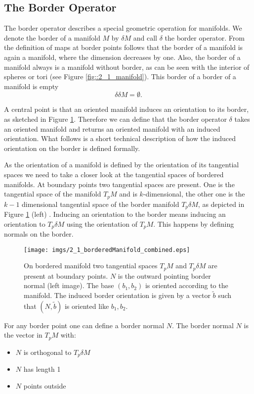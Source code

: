 \subsection{The Border Operator}
The border operator describes a special geometric operation for manifolds. 
We denote the border of a manifold $M$ by $\delta M$ and call $\delta$ the border operator. From the definition of maps at border points follows that the border of a manifold is again a manifold, where the dimension decreases by one. Also, the border of a manifold always is a manifold without border, as can be seen with the interior of spheres or tori (see Figure \ref{fig::2_1_manifold}). This border of a border of a manifold is empty
\[\delta\delta M = \emptyset.\]

A central point  is that an oriented manifold induces an orientation to its border, as sketched in Figure \ref{fig::2_1_borderManifold}. Therefore we can define that the border operator $\delta$ takes an oriented manifold and returns an oriented manifold with an induced orientation.  What follows is a short technical description of how the induced orientation on the border is defined formally. 

 As the orientation of a manifold is defined by the orientation of its tangential spaces we need to take a closer look at the tangential spaces of bordered manifolds.
At boundary points two tangential spaces are present. One is the tangential space of the manifold $T_pM$ and is $k$-dimensional, the other one is the $k-1$ dimensional tangential space of the border manifold $T_p \delta M$, as depicted in Figure \ref{fig::2_1_borderManifold} (left) . Inducing an orientation to the border means inducing an orientation to $T_p\delta M$ using the orientation of $T_p M$. This happens by defining normals on the border.

\begin{figure}
\begin{center}
\texttt{[image: imgs/2\_1\_borderedManifold\_combined.eps]}
\end{center}
\caption{On bordered manifold two tangential spaces $T_pM$ and $T_p\delta M$  are present at boundary points. $N$ is the outward pointing border normal (left image). The base $(b_1,b_2)$ is oriented according to the manifold. The induced border orientation is given by a vector $\widetilde{b}$ such that  $(N, \widetilde{b})$ is oriented like $b_1,b_2$.}
\label{fig::2_1_borderManifold}
\end{figure}

For any border point one can define a border normal $N$. The border normal $N$ is the vector in $T_p M$ with:
\begin{itemize}
\item $N$ is orthogonal to $T_p \delta M$
\item $N$ has length 1
\item $N$ points outside
\end{itemize}

